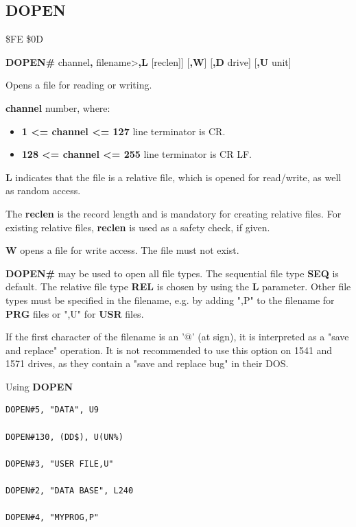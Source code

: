 \subsection{DOPEN}
\begin{description}[leftmargin=2cm,style=nextline]
\item [Token:]    \$FE \$0D
\item [Format:]   {\bf DOPEN\#} channel{\bf,} filename>{\bf,L} [reclen]] [{\bf,W}] [{\bf,D} drive] [{\bf,U} unit]
\item [Usage:]    Opens a file for reading or writing.

                  {\bf channel} number, where:
                  \begin{itemize}
                     \item {\bf 1 <= channel <= 127} line terminator is CR.
                     \item {\bf 128 <= channel <= 255} line terminator is CR LF.
                  \end{itemize}

                  {\bf L} indicates that the file is a relative file, which is opened for read/write, as well as random access.

                  The {\bf reclen} is the record length and is mandatory for creating relative files. For existing relative files, {\bf reclen} is used as a safety check, if given.

                  {\bf W} opens a file for write access. The file must not exist.

                  \filenamedefinition

                  \drivedefinition

                  \unitdefinition

\item [Remarks:]  {\bf DOPEN\#} may be used to open all file types. The sequential file type {\bf SEQ} is default. The relative file type {\bf REL} is chosen by using the {\bf L} parameter. Other file types must be specified in the filename, e.g. by adding ",P" to the filename for {\bf PRG} files or ",U" for {\bf USR} files.

                  If the first character of the filename is an '@' (at sign), it is interpreted as a "save and replace" operation. It is not recommended to use this option on 1541 and 1571 drives, as they contain a "save and replace bug" in their DOS.

\item [Examples:] Using {\bf DOPEN}

\begin{tcolorbox}[colback=black,coltext=white]
\verbatimfont{\codefont}
\begin{verbatim}
DOPEN#5, "DATA", U9

DOPEN#130, (DD$), U(UN%)

DOPEN#3, "USER FILE,U"

DOPEN#2, "DATA BASE", L240

DOPEN#4, "MYPROG,P"
\end{verbatim}
\end{tcolorbox}
\end{description}

